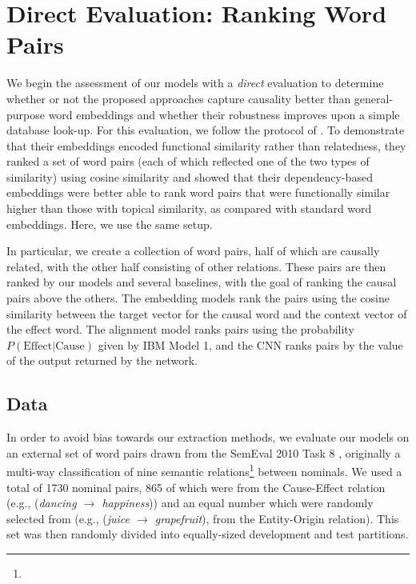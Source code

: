 
\section{Direct Evaluation: Ranking Word Pairs}
\label{sec-emnlp2016:directeval}


We begin the assessment of our models with a {\em direct} evaluation to determine whether or not the proposed approaches capture causality better than general-purpose word embeddings and whether their robustness improves upon a simple database look-up.
For this evaluation, we follow the protocol of \citet{levy2014dependency}.  
To demonstrate that their embeddings encoded functional similarity rather than relatedness, they ranked a set of word pairs (each of which reflected one of the two types of similarity) using cosine similarity and showed that their dependency-based embeddings were better able to rank word pairs that were functionally similar higher than those with topical similarity, as compared with standard word embeddings.  Here, we use the same setup. 
 
In particular, we create a collection of word pairs, half of which are causally related, with the other half consisting of other relations. 
These pairs are then ranked by our models and several baselines, with the goal of ranking the causal pairs above the others. 
The embedding models rank the pairs using the cosine similarity between the target vector for the causal word and the context vector of the effect word.  The alignment model ranks pairs using the probability $P(\text{Effect}|\text{Cause})$ given by IBM Model 1, and the CNN ranks pairs by the value of the output returned by the network.

\subsection{Data}
In order to avoid bias towards our extraction methods, we evaluate our models on an external set of word pairs drawn from the SemEval 2010 Task 8 \citep{hendrickx2009semeval}, originally a multi-way classification of nine semantic relations\footnote{} between nominals.  We used a total of 1730 nominal pairs, 865 of which were from the Cause-Effect relation (e.g., (\emph{dancing $\rightarrow$ happiness})) and an equal number which were randomly selected from  (e.g., (\emph{juice $\rightarrow$ grapefruit}), from the Entity-Origin relation).  This set was then randomly divided into equally-sized development and test partitions.

